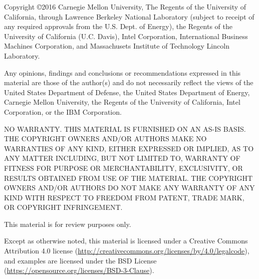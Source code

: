 \documentclass[11pt]{extbook}
\begin{document}
Copyright \copyright 2016 Carnegie Mellon University, The Regents 
of the University of California, through Lawrence Berkeley National 
Laboratory (subject to receipt of any required approvals from the 
U.S. Dept. of Energy), the Regents of the University of California 
(U.C. Davis), Intel Corporation, International Business Machines Corporation,
and Massachusets Institute of Technology Lincoln Laboratory. 

Any opinions, findings and conclusions or recommendations expressed in 
this material are those of the author(s) and do not necessarily reflect 
the views of the United States Department of Defense, the United States 
Department of Energy, Carnegie Mellon University, the Regents of the 
University of California, Intel Corporation, or the IBM Corporation.  

NO WARRANTY. THIS MATERIAL IS FURNISHED ON AN AS-IS BASIS. THE COPYRIGHT 
OWNERS AND/OR AUTHORS MAKE NO WARRANTIES OF ANY KIND, EITHER EXPRESSED 
OR IMPLIED, AS TO ANY MATTER INCLUDING, BUT NOT LIMITED TO, WARRANTY OF 
FITNESS FOR PURPOSE OR MERCHANTABILITY, EXCLUSIVITY, OR RESULTS OBTAINED 
FROM USE OF THE MATERIAL. THE COPYRIGHT OWNERS AND/OR AUTHORS DO NOT MAKE 
ANY WARRANTY OF ANY KIND WITH RESPECT TO FREEDOM FROM PATENT, TRADE MARK, 
OR COPYRIGHT INFRINGEMENT.

\begin{center}
{\Large This material is for review purposes only.}
\end{center}


Except as otherwise noted, this material is licensed under a Creative Commons Attribution 4.0 license (\href{http://creativecommons.org/licenses/by/4.0/legalcode}{http://creativecommons.org/licenses/by/4.0/legalcode}), 
and examples are licensed under the BSD License (\href{https://opensource.org/licenses/BSD-3-Clause}{https://opensource.org/licenses/BSD-3-Clause}).


\vfill

\pagebreak
\tableofcontents
\vfill
\pagebreak

\end{document}
